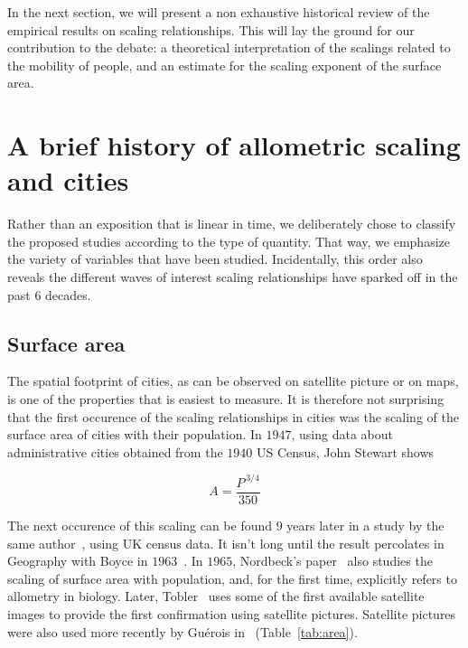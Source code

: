 In the next section, we will present a non exhaustive historical review of the
empirical results on scaling relationships. This will lay the ground for our contribution to the
debate: a theoretical interpretation of the scalings related to the mobility of
people, and an estimate for the scaling exponent of the surface area.  



\section{A brief history of allometric scaling and cities}
\label{sec:a_brief_history_of_allometric_scaling_and_cities} 

Rather than an exposition that is linear in time, we deliberately chose to
classify the proposed studies according to the type of quantity. That way, we  
emphasize the variety of variables that have been studied. Incidentally, this
order also reveals the different waves of interest scaling relationships have
sparked off in the past $6$ decades. 

\subsection{Surface area}
\label{sub:surface_area}

The spatial footprint of cities, as can be observed on satellite picture or on
maps, is one of the properties that is easiest to measure. It is therefore not
surprising that the first occurence of the scaling relationships in cities was
the scaling of the surface area of cities with their population. In $1947$,
using data about administrative cities obtained from the $1940$ US Census, John
Stewart shows

\begin{equation}
    A = \frac{P^{\,3/4}}{350}
\end{equation}

The next occurence of this scaling can be found $9$ years later in a study by
the same author~\cite{Stewart:1958}, using UK census data. It isn't
long until the result percolates in Geography with Boyce in $1963$~\cite{Boyce:1963}.
In $1965$, Nordbeck's paper~\cite{Nordbeck:1965} also studies the scaling of surface area
with population, and, for the first time, explicitly refers to allometry in
biology. Later, Tobler~\cite{Tobler:1969} uses some of the first available
satellite images to provide the first confirmation using satellite pictures.
Satellite pictures were also used more recently by Gu\'erois
in~\cite{Guerois:2003} (Table~\ref{tab:area}).\\

